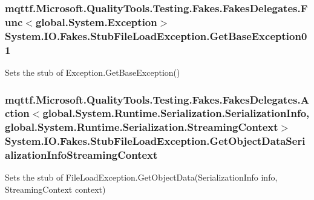 \hypertarget{class_system_1_1_i_o_1_1_fakes_1_1_stub_file_load_exception_ae00a1966d15216a6674be0bf2afe51da}{
\subsubsection[{Get\-Base\-Exception01}]{\setlength{\rightskip}{0pt plus 5cm}mqttf.\-Microsoft.\-Quality\-Tools.\-Testing.\-Fakes.\-Fakes\-Delegates.\-Func$<$global.\-System.\-Exception$>$ System.\-I\-O.\-Fakes.\-Stub\-File\-Load\-Exception.\-Get\-Base\-Exception01}}\label{class_system_1_1_i_o_1_1_fakes_1_1_stub_file_load_exception_ae00a1966d15216a6674be0bf2afe51da}


Sets the stub of Exception.\-Get\-Base\-Exception()

\hypertarget{class_system_1_1_i_o_1_1_fakes_1_1_stub_file_load_exception_ae60ea30f2686a1b3325407d52748660a}{
\subsubsection[{Get\-Object\-Data\-Serialization\-Info\-Streaming\-Context}]{\setlength{\rightskip}{0pt plus 5cm}mqttf.\-Microsoft.\-Quality\-Tools.\-Testing.\-Fakes.\-Fakes\-Delegates.\-Action$<$global.\-System.\-Runtime.\-Serialization.\-Serialization\-Info, global.\-System.\-Runtime.\-Serialization.\-Streaming\-Context$>$ System.\-I\-O.\-Fakes.\-Stub\-File\-Load\-Exception.\-Get\-Object\-Data\-Serialization\-Info\-Streaming\-Context}}\label{class_system_1_1_i_o_1_1_fakes_1_1_stub_file_load_exception_ae60ea30f2686a1b3325407d52748660a}


Sets the stub of File\-Load\-Exception.\-Get\-Object\-Data(\-Serialization\-Info info, Streaming\-Context context)

